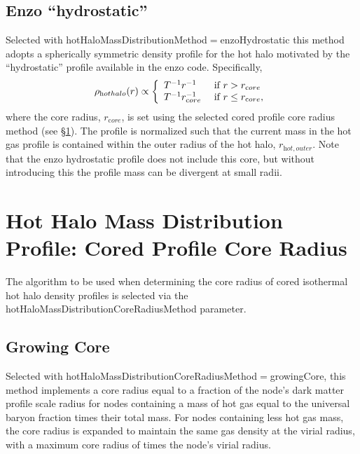 \subsection{Enzo ``hydrostatic''}\label{phys:hotHaloMassDistribution:hotHaloMassDistributionEnzoHydrostatic}

Selected with {\normalfont \ttfamily hotHaloMassDistributionMethod}$=${\normalfont \ttfamily enzoHydrostatic} this method adopts a spherically symmetric density profile for the hot halo motivated by the ``hydrostatic'' profile available in the \gls{enzo} code. Specifically,
\begin{equation}
 \rho_{\mathrm hot halo}(r) \propto \left\{ \begin{array}{ll} T^{-1} r^{-1} & \hbox{ if } r > r_{\mathrm core} \\ T^{-1} r_{\mathrm core}^{-1} & \hbox{ if } r \le r_{\mathrm core}, \end{array} \right. 
\end{equation}
where the core radius, $r_{\mathrm core}$, is set using the selected cored profile core radius method (see \S\ref{sec:hotHaloDensityProfileCoredIsothermalCoreRadius}). The profile is normalized such that the current mass in the hot gas profile is contained within the outer radius of the hot halo, $r_{\mathrm hot, outer}$. Note that the \gls{enzo} hydrostatic profile does not include this core, but without introducing this the profile mass can be divergent at small radii.

\section{Hot Halo Mass Distribution Profile: Cored Profile Core Radius}\label{sec:hotHaloDensityProfileCoredIsothermalCoreRadius}

The algorithm to be used when determining the core radius of cored isothermal hot halo density profiles is selected via the {\normalfont \ttfamily hotHaloMassDistributionCoreRadiusMethod} parameter.

\subsection{Growing Core}\label{phys:hotHaloMassDistributionCoreRadius:hotHaloMassDistributionCoreRadiusGrowing}

Selected with {\normalfont \ttfamily hotHaloMassDistributionCoreRadiusMethod}$=${\normalfont \ttfamily growingCore}, this method implements a core radius equal to a fraction {\normalfont \ttfamily [coreRadiusOverScaleRadius]} of the node's dark matter profile scale radius for nodes containing a mass of hot gas equal to the universal baryon fraction times their total mass. For nodes containing less hot gas mass, the core radius is expanded to maintain the same gas density at the virial radius, with a maximum core radius of {\normalfont \ttfamily [coreRadiusOverVirialRadiusMaximum]} times the node's virial radius.

